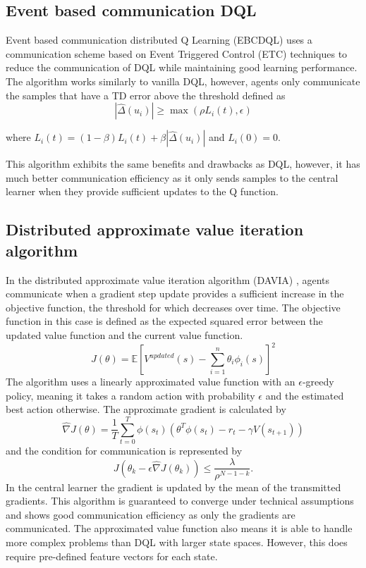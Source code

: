 \subsection{Event based communication DQL}
Event based communication distributed Q Learning (EBCDQL) \cite{EBCDQL} uses a communication scheme based on Event Triggered Control (ETC) \cite{ETC} techniques to reduce the communication of DQL while maintaining good learning performance.
The algorithm works similarly to vanilla DQL, however, agents only communicate the samples that have a TD error above the threshold defined as 
\begin{equation*}
    |\hat{\Delta}(u_i)| \geq \max(\rho L_i(t), \epsilon) 
\end{equation*}

where $L_i(t) = (1-\beta)L_i(t)+ \beta |\hat{\Delta}(u_i)|$ and $L_i(0)=0$.

This algorithm exhibits the same benefits and drawbacks as DQL, however, it has much better communication efficiency as it only sends samples to the central learner when they provide sufficient updates to the Q function.

\subsection{Distributed approximate value iteration algorithm}
In the distributed approximate value iteration algorithm (DAVIA) \cite{DAVIA}, agents communicate when a gradient step update provides a sufficient increase in the objective function, the threshold for which decreases over time. The objective function in this case is defined as the expected squared error between the updated value function and the current value function. 
\begin{equation*}
    J(\theta) = \mathbb{E}[V^{updated}(s) - \sum_{i=1}^n \theta_i \phi_i(s)]^2
\end{equation*} 
The algorithm uses a linearly approximated value function with an $\epsilon$-greedy policy, meaning it takes a random action with probability $\epsilon$ and the estimated best action otherwise.
The approximate gradient is calculated by
\begin{equation*}
    \hat{\nabla}J(\theta) = \frac{1}{T} \sum^T_{t=0} \phi(s_t)(\theta^T \phi(s_t) - r_t - \gamma V(s_{t+1}))
\end{equation*}
and the condition for communication is represented by 
\begin{equation*}
    J(\theta_k - \epsilon \hat{\nabla}J(\theta_k)) \leq \frac{\lambda}{\rho^{N-1-k}}.
\end{equation*}
In the central learner the gradient is updated by the mean of the transmitted gradients. This algorithm is guaranteed to converge under technical assumptions and shows good communication efficiency as only the gradients are communicated. The approximated value function also means it is able to handle more complex problems than DQL with larger state spaces. However, this does require pre-defined feature vectors for each state.

